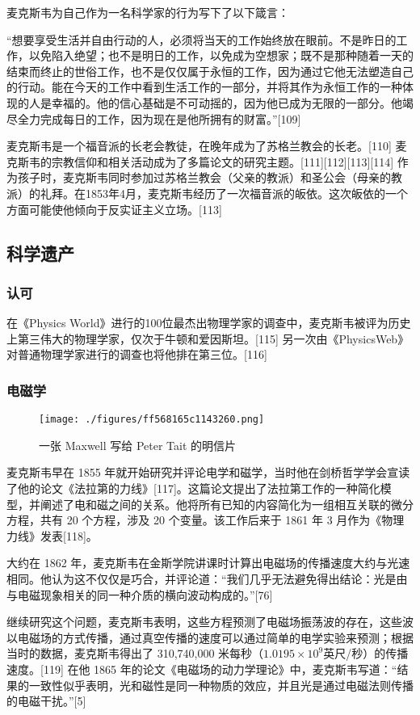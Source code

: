 麦克斯韦为自己作为一名科学家的行为写下了以下箴言：

“想要享受生活并自由行动的人，必须将当天的工作始终放在眼前。不是昨日的工作，以免陷入绝望；也不是明日的工作，以免成为空想家；既不是那种随着一天的结束而终止的世俗工作，也不是仅仅属于永恒的工作，因为通过它他无法塑造自己的行动。能在今天的工作中看到生活工作的一部分，并将其作为永恒工作的一种体现的人是幸福的。他的信心基础是不可动摇的，因为他已成为无限的一部分。他竭尽全力完成每日的工作，因为现在是他所拥有的财富。”[109]

麦克斯韦是一个福音派的长老会教徒，在晚年成为了苏格兰教会的长老。[110] 麦克斯韦的宗教信仰和相关活动成为了多篇论文的研究主题。[111][112][113][114] 作为孩子时，麦克斯韦同时参加过苏格兰教会（父亲的教派）和圣公会（母亲的教派）的礼拜。在1853年4月，麦克斯韦经历了一次福音派的皈依。这次皈依的一个方面可能使他倾向于反实证主义立场。[113]
\subsection{科学遗产}  
\subsubsection{认可}  
在《Physics World》进行的100位最杰出物理学家的调查中，麦克斯韦被评为历史上第三伟大的物理学家，仅次于牛顿和爱因斯坦。[115] 另一次由《PhysicsWeb》对普通物理学家进行的调查也将他排在第三位。[116]
\subsubsection{电磁学}
\begin{figure}[ht]
\centering
\texttt{[image: ./figures/ff568165c1143260.png]}
\caption{一张 Maxwell 写给 Peter Tait 的明信片} \label{fig_Clerk_10}
\end{figure}
麦克斯韦早在 1855 年就开始研究并评论电学和磁学，当时他在剑桥哲学学会宣读了他的论文《法拉第的力线》[117]。这篇论文提出了法拉第工作的一种简化模型，并阐述了电和磁之间的关系。他将所有已知的内容简化为一组相互关联的微分方程，共有 20 个方程，涉及 20 个变量。该工作后来于 1861 年 3 月作为《物理力线》发表[118]。

大约在 1862 年，麦克斯韦在金斯学院讲课时计算出电磁场的传播速度大约与光速相同。他认为这不仅仅是巧合，并评论道：“我们几乎无法避免得出结论：光是由与电磁现象相关的同一种介质的横向波动构成的。”[76]

继续研究这个问题，麦克斯韦表明，这些方程预测了电磁场振荡波的存在，这些波以电磁场的方式传播，通过真空传播的速度可以通过简单的电学实验来预测；根据当时的数据，麦克斯韦得出了 310,740,000 米每秒（\(1.0195\times10^9 \)英尺/秒）的传播速度。[119] 在他 1865 年的论文《电磁场的动力学理论》中，麦克斯韦写道：“结果的一致性似乎表明，光和磁性是同一种物质的效应，并且光是通过电磁法则传播的电磁干扰。”[5]

